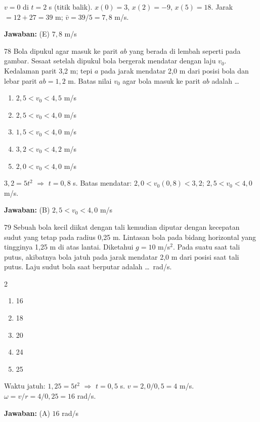 \documentclass[11pt]{article}
\newenvironment{pil}{%
  \begin{enumerate}[label=(\Alph*),leftmargin=*,itemsep=1pt,topsep=3pt]}%
  {\end{enumerate}}
\newenvironment{pilB}{%
  \par\smallskip\begin{multicols}{2}
  \begin{enumerate}[label=(\Alph*),leftmargin=*,itemsep=1pt,topsep=3pt]}%
  {\end{enumerate}\end{multicols}}
\newcommand{\jawaban}[1]{%
  \noindent\colorbox{gold!30}{\parbox{\dimexpr\linewidth-2\fboxsep\relax}{%
    \textbf{Jawaban:} #1}}\par\smallskip}
\begin{document}
\begin{pembox}
$v=0$ di $t=2$ s (titik balik). $x(0)=3$, $x(2)=-9$, $x(5)=18$. Jarak $=12+27=39$ m; $\bar v=39/5=7{,}8$ m/s.
\jawaban{(E) $7{,}8$ m/s}
\end{pembox}

\begin{soal}{78}
Bola dipukul agar masuk ke parit $ab$ yang berada di lembah seperti pada
gambar. Sesaat setelah dipukul bola bergerak mendatar dengan laju $v_0$.
Kedalaman parit 3,2 m; tepi $a$ pada jarak mendatar 2,0 m dari posisi
bola dan lebar parit $ab=1{,}2$ m. Batas nilai $v_0$ agar bola masuk
ke parit $ab$ adalah \ldots
\begin{pil}
  \item $2{,}5<v_0<4{,}5$ m/s \item $2{,}5<v_0<4{,}0$ m/s
  \item $1{,}5<v_0<4{,}0$ m/s \item $3{,}2<v_0<4{,}2$ m/s
  \item $2{,}0<v_0<4{,}0$ m/s
\end{pil}
\end{soal}

\begin{pembox}
$3{,}2=5t^2$ $\Rightarrow$ $t=0{,}8$ s. Batas mendatar: $2{,}0<v_0(0{,}8)<3{,}2$; $2{,}5<v_0<4{,}0$ m/s.
\jawaban{(B) $2{,}5<v_0<4{,}0$ m/s}
\end{pembox}

\begin{soal}{79}
Sebuah bola kecil diikat dengan tali kemudian diputar dengan kecepatan
sudut yang tetap pada radius 0,25 m. Lintasan bola pada bidang horizontal
yang tingginya 1,25 m di atas lantai. Diketahui $g=10$ m/s$^2$. Pada
suatu saat tali putus, akibatnya bola jatuh pada jarak mendatar 2,0 m
dari posisi saat tali putus. Laju sudut bola saat berputar adalah
\ldots\ rad/s.
\begin{pilB}
  \item 16 \item 18 \item 20 \item 24 \item 25
\end{pilB}
\end{soal}

\begin{pembox}
Waktu jatuh: $1{,}25=5t^2$ $\Rightarrow$ $t=0{,}5$ s. $v=2{,}0/0{,}5=4$ m/s. $\omega=v/r=4/0{,}25=16$ rad/s.
\jawaban{(A) $16$ rad/s}
\end{pembox}
\end{document}
